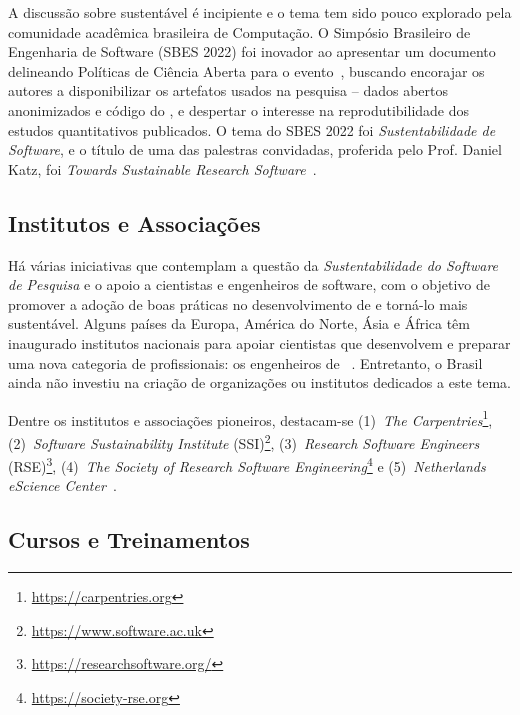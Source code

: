 A discussão sobre \RSw sustentável é incipiente e o tema tem sido pouco explorado pela comunidade acadêmica brasileira de Computação. 
O Simpósio Brasileiro de Engenharia de Software (SBES 2022) foi inovador ao apresentar um documento 
delineando Políticas de Ciência Aberta para o evento~\cite{flach:politicas:os}, buscando
encorajar os autores a disponibilizar os artefatos usados na pesquisa -- dados abertos anonimizados e código do \RS, e despertar o interesse na reprodutibilidade dos estudos quantitativos publicados.
O tema do SBES 2022 foi \textit{Sustentabilidade de Software}, e o título de uma das palestras convidadas, proferida pelo Prof. Daniel Katz, foi \textit{Towards Sustainable Research Software}~\cite{katz_daniel_s_2022_7140726}.

\subsection{Institutos e Associações}

Há várias iniciativas que contemplam a questão da \textit{Sustentabilidade do Software de Pesquisa} e 
o apoio a cientistas e engenheiros de software, com o objetivo de promover a adoção de boas práticas no desenvolvimento de \RSw e torná-lo mais sustentável.
%
Alguns países da Europa, América do Norte, Ásia e África têm inaugurado institutos nacionais para apoiar cientistas que desenvolvem \RSw e preparar uma nova categoria de profissionais: os engenheiros de \RS~\cite{jimenez_four_2017}. Entretanto, o Brasil ainda não investiu na criação de organizações ou institutos dedicados a este tema.

Dentre os institutos e associações pioneiros, destacam-se 
(1)~\textit{The Carpentries}\footnote{\url{https://carpentries.org}}, 
(2)~\textit{Software Sustainability Institute} (SSI)\footnote{\url{https://www.software.ac.uk}}, (3)~\textit{Research Software Engineers} (RSE)\footnote{\url{https://researchsoftware.org/}}, 
(4)~\textit{The Society of Research Software Engineering}\footnote{\url{https://society-rse.org}} e  
(5)~\textit{Netherlands eScience Center}~\cite{drost_niels_2020_4020622}. 

\subsection{Cursos e Treinamentos}

